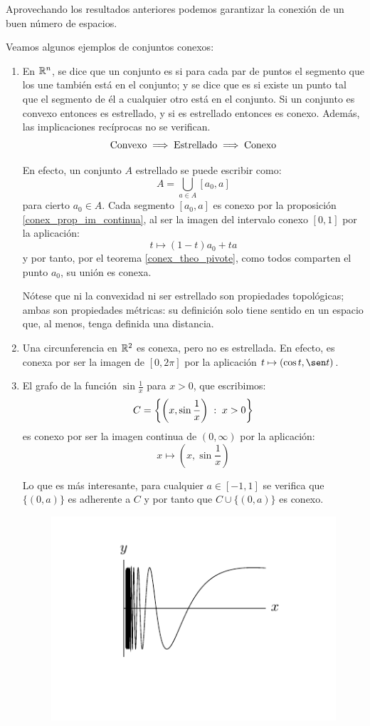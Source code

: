 Aprovechando los resultados anteriores podemos garantizar la conexión de un buen número de espacios.

\begin{exa} Veamos algunos ejemplos de conjuntos conexos:
	\begin{enumerate}
		\item En $\mathbb{R}^n$, se dice que un conjunto es  si para cada par de puntos el segmento que los une también está en el conjunto; y se dice que es  si existe un punto tal que el segmento de él a cualquier otro está en el conjunto. Si un conjunto es convexo entonces es estrellado, y si es estrellado entonces es conexo. Además, las implicaciones recíprocas no se verifican.
		\[\text{Convexo}\implies\text{Estrellado}\implies \text{Conexo}\]
		
		En efecto, un conjunto $A$ estrellado se puede escribir como:
		\[A=\bigcup_{a\in A} [a_0, a]\]
		para cierto $a_0\in A$. Cada segmento $[a_0,a]$ es conexo por la proposición \ref{conex_prop_im_continua}, al ser la imagen del intervalo conexo $[0,1]$ por la aplicación:
		\[t\mapsto (1-t)a_0+ta\]
		y por tanto, por el teorema \ref{conex_theo_pivote}, como todos comparten el punto $a_0$, su unión es conexa.
		
		Nótese que ni la convexidad ni ser estrellado son propiedades topológicas; ambas son propiedades métricas: su definición solo tiene sentido en un espacio que, al menos, tenga definida una distancia.
		
		\item Una circunferencia en $\mathbb{R}^2$ es conexa, pero no es estrellada. En efecto, es conexa por ser la imagen de $[0,2\pi]$ por la aplicación $t\mapsto (\cos t, \sen t)$.
		
		\item El grafo de la función $\sin\frac{1}{x}$ para $x>0$, que escribimos:
		\[C = \left\{\left(x,\sin\frac{1}{x}\right)\;:\; x>0\right\}\]
		es conexo por ser la imagen continua de $(0,\infty)$ por la aplicación:
		\[x\mapsto \left(x,\sin\frac{1}{x}\right)\]
		
		Lo que es más interesante, para cualquier $a\in [-1,1]$ se verifica que $\{(0,a)\}$ es adherente a $C$ y por tanto que $C\cup\{(0,a)\}$ es conexo.
		\begin{figure}[H]
			\centering
			\includegraphics[scale = 1.3]{img/funcionsen1x}
		\end{figure}
		

\end{enumerate}
\end{exa}
